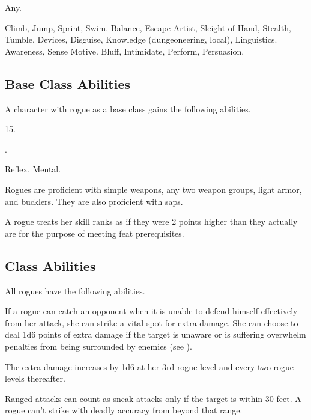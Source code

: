      Any.

     Climb, Jump, Sprint, Swim.
     Balance, Escape Artist, Sleight of Hand, Stealth, Tumble.
     Devices, Disguise, Knowledge (dungeoneering, local), Linguistics.
     Awareness, Sense Motive.
     Bluff, Intimidate, Perform, Persuasion.

    \subsection{Base Class Abilities}
        A character with rogue as a base class gains the following abilities.

         15.

         .

          Reflex,  Mental.

        Rogues are proficient with simple weapons, any two weapon groups, light armor, and bucklers.
        They are also proficient with saps.

        A rogue treats her skill ranks as if they were 2 points higher than they actually are for the purpose of meeting feat prerequisites.

    \subsection{Class Abilities}
        All rogues have the following abilities.

        If a rogue can catch an opponent when it is unable to defend himself effectively from her attack, she can strike a vital spot for extra damage.
        She can choose to deal 1d6 points of extra damage if the target is unaware or is suffering overwhelm penalties from being surrounded by enemies (see ).

        The extra damage increases by 1d6 at her 3rd rogue level and every two rogue levels thereafter.

        \par Ranged attacks can count as sneak attacks only if the target is within 30 feet.
        A rogue can't strike with deadly accuracy from beyond that range.

